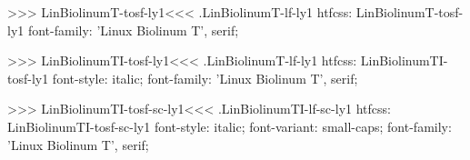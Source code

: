 >>>
\<LinBiolinumT-tosf-ly1\><<<
.LinBiolinumT-lf-ly1
htfcss:  LinBiolinumT-tosf-ly1  font-family: 'Linux Biolinum T', serif;

>>>
\<LinBiolinumTI-tosf-ly1\><<<
.LinBiolinumT-lf-ly1
htfcss:  LinBiolinumTI-tosf-ly1  font-style: italic; font-family: 'Linux Biolinum T', serif;

>>>
\<LinBiolinumTI-tosf-sc-ly1\><<<
.LinBiolinumTI-lf-sc-ly1
htfcss:  LinBiolinumTI-tosf-sc-ly1  font-style: italic; font-variant: small-caps; font-family: 'Linux Biolinum T', serif;

